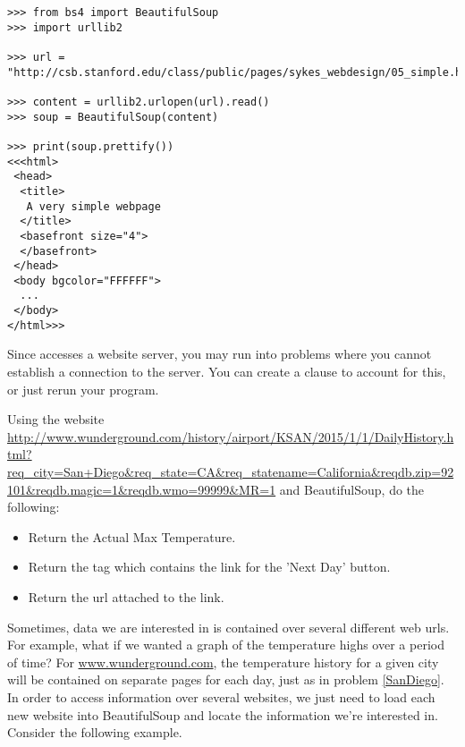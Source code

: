 \begin{lstlisting}
>>> from bs4 import BeautifulSoup
>>> import urllib2

>>> url = "http://csb.stanford.edu/class/public/pages/sykes_webdesign/05_simple.html"

>>> content = urllib2.urlopen(url).read()
>>> soup = BeautifulSoup(content)

>>> print(soup.prettify())
<<<html>
 <head>
  <title>
   A very simple webpage
  </title>
  <basefront size="4">
  </basefront>
 </head>
 <body bgcolor="FFFFFF">
  ...
 </body>
</html>>>
\end{lstlisting}

\begin{warn}
Since  accesses a website server, you may run into problems where you cannot establish a connection to the server.
You can create a  clause to account for this, or just rerun your program.
\end{warn}

\begin{problem}\label{SanDiego}

Using the website \url{http://www.wunderground.com/history/airport/KSAN/2015/1/1/DailyHistory.html?req_city=San+Diego&req_state=CA&req_statename=California&reqdb.zip=92101&reqdb.magic=1&reqdb.wmo=99999&MR=1} 
and BeautifulSoup, do the following:
\begin{itemize}
\item Return the Actual Max Temperature.
\item Return the tag which contains the link for the 'Next Day' button.
\item Return the url attached to the link.
\end{itemize}

\end{problem}

Sometimes, data we are interested in is contained over several different web urls.
For example, what if we wanted a graph of the temperature highs over a period of time?
For \url{www.wunderground.com}, the temperature history for a given city will be contained on separate pages for each day, just as in problem \ref{SanDiego}. In order to access information over several websites, we just need to load each new website into BeautifulSoup and locate the information we're interested in. Consider the following example.

